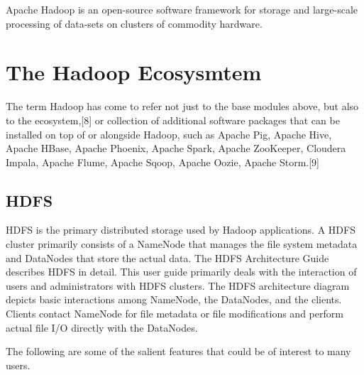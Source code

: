 Apache Hadoop is an open-source software framework for storage and large-scale processing of data-sets on clusters of commodity hardware.
\section{The Hadoop Ecosysmtem}
The term Hadoop has come to refer not just to the base modules above, but also to the ecosystem,[8] or collection of additional software packages that can be installed on top of or alongside Hadoop, such as Apache Pig, Apache Hive, Apache HBase, Apache Phoenix, Apache Spark, Apache ZooKeeper, Cloudera Impala, Apache Flume, Apache Sqoop, Apache Oozie, Apache Storm.[9]

\subsection{HDFS}

HDFS is the primary distributed storage used by Hadoop applications. A HDFS cluster primarily consists of a NameNode that manages the file system metadata and DataNodes that store the actual data. The HDFS Architecture Guide describes HDFS in detail. This user guide primarily deals with the interaction of users and administrators with HDFS clusters. The HDFS architecture diagram depicts basic interactions among NameNode, the DataNodes, and the clients. Clients contact NameNode for file metadata or file modifications and perform actual file I/O directly with the DataNodes.

The following are some of the salient features that could be of interest to many users.

